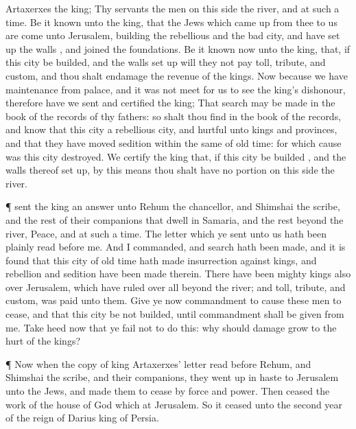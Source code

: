 {Artaxerxes the
king; Thy
servants the
men on this
side the
river, and at such a
time.
Be
it
known unto the
king, that the
Jews
which came
up
from
thee to
us are
come unto
Jerusalem,
building the
rebellious and the
bad
city, and have set
up the
walls
{}, and
joined the
foundations.
Be it
known
now unto the
king, that,
if
this
city be
builded, and the
walls set
up
{} will they
not
pay
toll,
tribute, and
custom, and
{} thou shalt
endamage the
revenue of the
kings.
Now
because we
have
maintenance from
{}
palace, and it was
not
meet for us to
see the
king’s
dishonour,
therefore have we
sent and
certified the
king;
That
search may be made in the
book of the
records of thy
fathers: so shalt thou
find in the
book of the
records, and
know that
this
city
{} a
rebellious
city, and
hurtful unto
kings and
provinces, and that they have
moved
sedition within the
same
of
old
time:
for
which cause was
this
city
destroyed.
We
certify the
king that,
if
this
city be
builded
{}, and the
walls thereof set
up, by
this
means thou shalt
have
no
portion on this
side the
river.
\par }{\PP {}¶
{}
sent the
king an
answer
unto
Rehum the
chancellor, and
{}
Shimshai the
scribe, and
{} the
rest of their
companions that
dwell in
Samaria, and
{} the
rest
beyond the
river,
Peace, and at such a
time.
The
letter which ye
sent unto
us hath been
plainly
read
before me.
And
I
commanded, and
search hath been made, and it is
found that
this
city
of
old
time hath made
insurrection
against
kings, and
{}
rebellion and
sedition have been
made therein.
There have
been
mighty
kings also
over
Jerusalem, which have
ruled over
all
{}
beyond the
river; and
toll,
tribute, and
custom, was
paid unto them.
Give ye
now
commandment to
cause
these
men to
cease, and that
this
city be
not
builded,
until
{}
commandment shall be
given from
me.
Take
heed now that ye
fail not to
do
this:
why should
damage
grow to the
hurt of the
kings?
\par }{\PP {}¶
Now
when the
copy of
king
Artaxerxes’
letter
{}
read
before
Rehum, and
Shimshai the
scribe, and their
companions, they went
up in
haste to
Jerusalem
unto the
Jews, and made
them to
cease by
force and
power.
Then
ceased the
work of the
house of
God which
{} at
Jerusalem. So it
ceased
unto the
second
year of the
reign of
Darius
king of
Persia.

}
